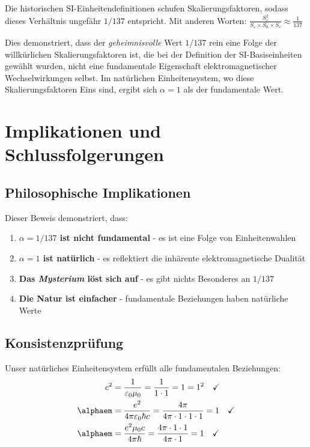 	Die historischen SI-Einheitendefinitionen schufen Skalierungsfaktoren, sodass dieses Verhältnis ungefähr $1/137$ entspricht. Mit anderen Worten:
	$\frac{S_e^2}{S_{\varepsilon} \times S_{\hbar} \times S_c} \approx \frac{1}{137}$
	
	Dies demonstriert, dass der \textit{geheimnisvolle} Wert $1/137$ rein eine Folge der willkürlichen Skalierungsfaktoren ist, die bei der Definition der SI-Basiseinheiten gewählt wurden, nicht eine fundamentale Eigenschaft elektromagnetischer Wechselwirkungen selbst. Im natürlichen Einheitensystem, wo diese Skalierungsfaktoren Eins sind, ergibt sich $\alpha = 1$ als der fundamentale Wert.
	
	\section{Implikationen und Schlussfolgerungen}
	
	\subsection{Philosophische Implikationen}
	
	Dieser Beweis demonstriert, dass:
	
	\begin{enumerate}
		\item \textbf{$\alpha = 1/137$ ist nicht fundamental} - es ist eine Folge von Einheitenwahlen
		\item \textbf{$\alpha = 1$ ist natürlich} - es reflektiert die inhärente elektromagnetische Dualität
		\item \textbf{Das \textit{Mysterium} löst sich auf} - es gibt nichts Besonderes an $1/137$
		\item \textbf{Die Natur ist einfacher} - fundamentale Beziehungen haben natürliche Werte
	\end{enumerate}
	
	\subsection{Konsistenzprüfung}
	
	\begin{tcolorbox}[colback=blue!5!white,colframe=blue!75!black,title=Interne Konsistenzverifikation]
		Unser natürliches Einheitensystem erfüllt alle fundamentalen Beziehungen:
		\begin{align}
			c^2 &= \frac{1}{\varepsilon_0\mu_0} = \frac{1}{1 \cdot 1} = 1 = 1^2 \quad \checkmark\\
			\alphaem &= \frac{e^2}{4\pi\varepsilon_0\hbar c} = \frac{4\pi}{4\pi \cdot 1 \cdot 1 \cdot 1} = 1 \quad \checkmark\\
			\alphaem &= \frac{e^2\mu_0 c}{4\pi\hbar} = \frac{4\pi \cdot 1 \cdot 1}{4\pi \cdot 1} = 1 \quad \checkmark
		\end{align}
	\end{tcolorbox}
	
